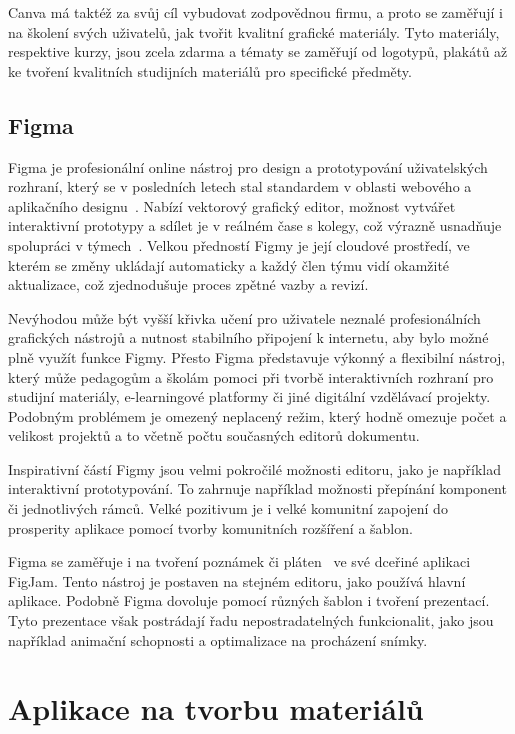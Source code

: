 Canva má taktéž za svůj cíl vybudovat zodpovědnou firmu, a proto se zaměřují i na školení svých uživatelů, jak tvořit kvalitní grafické materiály.
Tyto materiály, respektive kurzy, jsou zcela zdarma a tématy se zaměřují od logotypů, plakátů až ke tvoření kvalitních studijních materiálů pro specifické předměty.


\subsection{Figma}\label{text:figma_popis}

Figma je profesionální online nástroj pro design a prototypování uživatelských rozhraní, který se v posledních letech stal standardem v oblasti webového a aplikačního designu~\cite{figma_website}. 
Nabízí vektorový grafický editor, možnost vytvářet interaktivní prototypy a sdílet je v reálném čase s kolegy, což výrazně usnadňuje spolupráci v týmech~\cite{figma_website}. 
Velkou předností Figmy je její cloudové prostředí, ve kterém se změny ukládají automaticky a každý člen týmu vidí okamžité aktualizace, což zjednodušuje proces zpětné vazby a revizí. 

Nevýhodou může být vyšší křivka učení pro uživatele neznalé profesionálních grafických nástrojů a nutnost stabilního připojení k internetu, aby bylo možné plně využít funkce Figmy. 
Přesto Figma představuje výkonný a flexibilní nástroj, který může pedagogům a školám pomoci při tvorbě interaktivních rozhraní pro studijní materiály, e-learningové platformy či jiné digitální vzdělávací projekty.
Podobným problémem je omezený neplacený režim, který hodně omezuje počet a velikost projektů a to včetně počtu současných editorů dokumentu.

Inspirativní částí Figmy jsou velmi pokročilé možnosti editoru, jako je například interaktivní prototypování.
To zahrnuje například možnosti přepínání komponent či jednotlivých rámců.
Velké pozitivum je i velké komunitní zapojení do prosperity aplikace pomocí tvorby komunitních rozšíření a šablon.

Figma se zaměřuje i na tvoření poznámek či pláten~\cite{figma_figjam} ve své dceřiné aplikaci FigJam.
Tento nástroj je postaven na stejném editoru, jako používá hlavní aplikace.
Podobně Figma dovoluje pomocí různých šablon i tvoření prezentací.
Tyto prezentace však postrádají řadu nepostradatelných funkcionalit, jako jsou například animační schopnosti a optimalizace na procházení snímky.

\section{Aplikace na tvorbu materiálů}\label{text:analyza/materialy}

